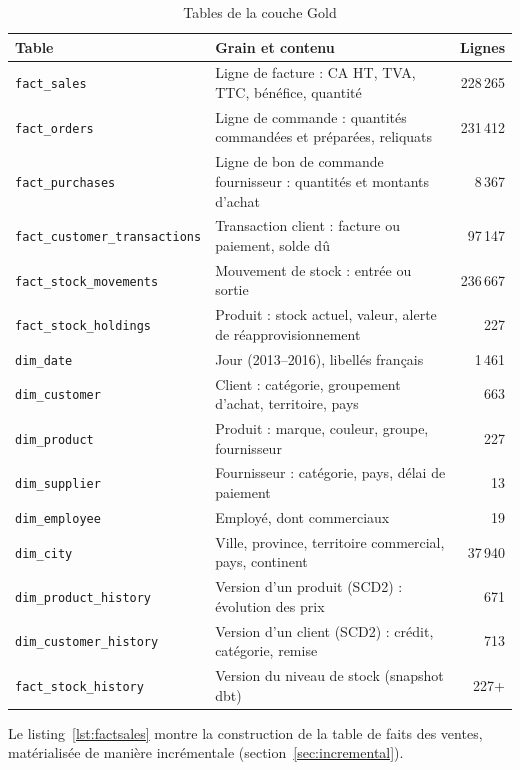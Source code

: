 \begin{table}[H]
\centering
\caption{Tables de la couche Gold}
\label{tab:gold}
\begin{tabularx}{\linewidth}{@{}l X r@{}}
\toprule
\textbf{Table} & \textbf{Grain et contenu} & \textbf{Lignes} \\
\midrule
\texttt{fact\_sales} & Ligne de facture : CA HT, TVA, TTC, bénéfice, quantité & 228\,265 \\
\texttt{fact\_orders} & Ligne de commande : quantités commandées et préparées, reliquats & 231\,412 \\
\texttt{fact\_purchases} & Ligne de bon de commande fournisseur : quantités et montants d'achat & 8\,367 \\
\texttt{fact\_customer\_transactions} & Transaction client : facture ou paiement, solde dû & 97\,147 \\
\texttt{fact\_stock\_movements} & Mouvement de stock : entrée ou sortie & 236\,667 \\
\texttt{fact\_stock\_holdings} & Produit : stock actuel, valeur, alerte de réapprovisionnement & 227 \\
\midrule
\texttt{dim\_date} & Jour (2013--2016), libellés français & 1\,461 \\
\texttt{dim\_customer} & Client : catégorie, groupement d'achat, territoire, pays & 663 \\
\texttt{dim\_product} & Produit : marque, couleur, groupe, fournisseur & 227 \\
\texttt{dim\_supplier} & Fournisseur : catégorie, pays, délai de paiement & 13 \\
\texttt{dim\_employee} & Employé, dont commerciaux & 19 \\
\texttt{dim\_city} & Ville, province, territoire commercial, pays, continent & 37\,940 \\
\midrule
\texttt{dim\_product\_history} & Version d'un produit (SCD2) : évolution des prix & 671 \\
\texttt{dim\_customer\_history} & Version d'un client (SCD2) : crédit, catégorie, remise & 713 \\
\texttt{fact\_stock\_history} & Version du niveau de stock (snapshot dbt) & 227+ \\
\bottomrule
\end{tabularx}
\end{table}

Le listing~\ref{lst:factsales} montre la construction de la table de faits des ventes, matérialisée de
manière incrémentale (section~\ref{sec:incremental}).

